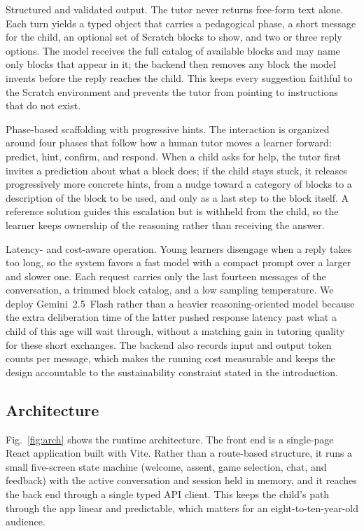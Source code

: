 \documentclass[conference]{IEEEtran}
\begin{document}
Structured and validated output. The tutor never returns free-form text alone. Each turn yields a typed object that carries a pedagogical phase, a short message for the child, an optional set of Scratch blocks to show, and two or three reply options. The model receives the full catalog of available blocks and may name only blocks that appear in it; the backend then removes any block the model invents before the reply reaches the child. This keeps every suggestion faithful to the Scratch environment and prevents the tutor from pointing to instructions that do not exist.

Phase-based scaffolding with progressive hints. The interaction is organized around four phases that follow how a human tutor moves a learner forward: predict, hint, confirm, and respond. When a child asks for help, the tutor first invites a prediction about what a block does; if the child stays stuck, it releases progressively more concrete hints, from a nudge toward a category of blocks to a description of the block to be used, and only as a last step to the block itself. A reference solution guides this escalation but is withheld from the child, so the learner keeps ownership of the reasoning rather than receiving the answer.

Latency- and cost-aware operation. Young learners disengage when a reply takes too long, so the system favors a fast model with a compact prompt over a larger and slower one. Each request carries only the last fourteen messages of the conversation, a trimmed block catalog, and a low sampling temperature. We deploy Gemini~2.5~Flash rather than a heavier reasoning-oriented model because the extra deliberation time of the latter pushed response latency past what a child of this age will wait through, without a matching gain in tutoring quality for these short exchanges. The backend also records input and output token counts per message, which makes the running cost measurable and keeps the design accountable to the sustainability constraint stated in the introduction.

\subsection{Architecture}

Fig.~\ref{fig:arch} shows the runtime architecture. The front end is a single-page React application built with Vite. Rather than a route-based structure, it runs a small five-screen state machine (welcome, assent, game selection, chat, and feedback) with the active conversation and session held in memory, and it reaches the back end through a single typed API client. This keeps the child's path through the app linear and predictable, which matters for an eight-to-ten-year-old audience.
\end{document}
